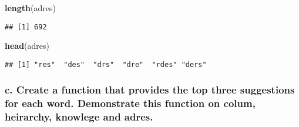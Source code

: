 \documentclass[]{article}
\newenvironment{Shaded}{\begin{snugshade}}{\end{snugshade}}
\newcommand{\ControlFlowTok}[1]{\textcolor[rgb]{0.13,0.29,0.53}{\textbf{#1}}}
\newcommand{\DataTypeTok}[1]{\textcolor[rgb]{0.13,0.29,0.53}{#1}}
\newcommand{\DecValTok}[1]{\textcolor[rgb]{0.00,0.00,0.81}{#1}}
\newcommand{\KeywordTok}[1]{\textcolor[rgb]{0.13,0.29,0.53}{\textbf{#1}}}
\newcommand{\NormalTok}[1]{#1}
\newcommand{\OperatorTok}[1]{\textcolor[rgb]{0.81,0.36,0.00}{\textbf{#1}}}
\newcommand{\StringTok}[1]{\textcolor[rgb]{0.31,0.60,0.02}{#1}}
\begin{document}
\begin{Shaded}
\begin{Highlighting}[]
\KeywordTok{length}\NormalTok{(adres)}
\end{Highlighting}
\end{Shaded}

\begin{verbatim}
## [1] 692
\end{verbatim}

\begin{Shaded}
\begin{Highlighting}[]
\KeywordTok{head}\NormalTok{(adres)}
\end{Highlighting}
\end{Shaded}

\begin{verbatim}
## [1] "res"  "des"  "drs"  "dre"  "rdes" "ders"
\end{verbatim}

\hypertarget{c.-create-a-function-that-provides-the-top-three-suggestions-for-each-word.-demonstrate-this-function-on-colum-heirarchy-knowlege-and-adres.}{%
\subsubsection{c. Create a function that provides the top three
suggestions for each word. Demonstrate this function on colum,
heirarchy, knowlege and
adres.}\label{c.-create-a-function-that-provides-the-top-three-suggestions-for-each-word.-demonstrate-this-function-on-colum-heirarchy-knowlege-and-adres.}}

\begin{Shaded}
\end{Shaded}
\end{document}
